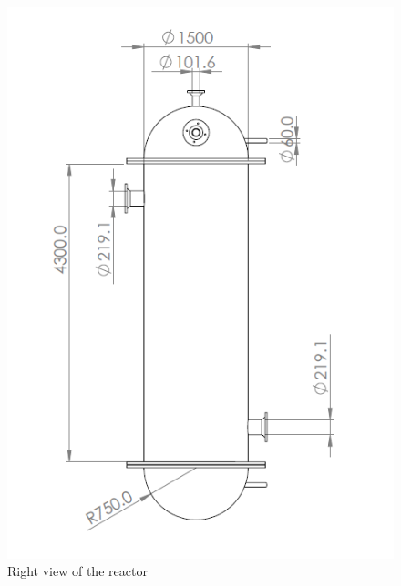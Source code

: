 \begin{figure}
    \centering
    \includegraphics[width=0.49\linewidth]{chapters/2-reaction/figures/FYD reactor right view with calc.PNG}
    \caption{Right view of the reactor}
    \label{fig:reactorright}
\end{figure}

